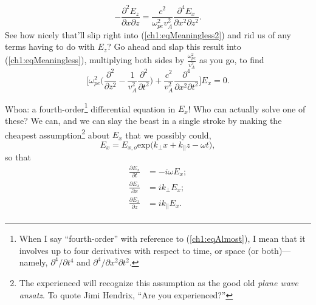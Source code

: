 \begin{equation*}
  -\dfrac{\partial^2 E_z}{\partial x \partial z} = \dfrac{c^2}{\omega_{pe}^2 v_A^2} \dfrac{\partial^4 E_x}{\partial x^2 \partial z^2}.
\end{equation*}
See how nicely that'll slip right into (\ref{ch1:eqMeaningless2}) and rid us of
any terms having to do with $E_z$? Go ahead and slap this result into
(\ref{ch1:eqMeaningless}), multiplying both sides by
$\frac{\omega_{pe}^2}{v_A^2}$ as you go, to find
\begin{equation} \label{ch1:eqAlmost}
  \Big [ \omega_{pe}^2 \Big ( \dfrac{\partial^2}{\partial z^2} - \dfrac{1}{v_A^2} \dfrac{\partial^2}{\partial t^2} \Big ) + \dfrac{c^2}{v_A^2} \dfrac{\partial^4}{\partial x^2 \partial t^2} \Big ] E_x = 0.
\end{equation}

Whoa: a fourth-order\footnote{When I say ``fourth-order'' with reference to
  (\ref{ch1:eqAlmost}), I mean that it involves up to four derivatives with
  respect to time, or space (or both)---namely, $\partial^4/\partial t^4$ and
  $\partial^4 / \partial x^2 \partial t^2$.}  differential equation in $E_x$!
Who can actually solve one of these? We can, and we can slay the beast in a
single stroke by making the cheapest assumption\footnote{The experienced will
  recognize this assumption as the good old \emph{plane wave ansatz}. To quote
  Jimi Hendrix, ``Are you experienced?''}  about $E_x$ that we possibly could,
\begin{equation*}
  E_x = E_{x,o} \mathrm{exp} \Big ( k_\perp x + k_\parallel z - \omega t \Big ),
\end{equation*}
so that 
\begin{equation} \label{ch1:bro}
  \begin{alignedat}{2}
\frac{\partial E_x}{\partial t} &=  -i \omega E_x; \\
\frac{\partial E_x}{\partial x} &=   i k_\perp E_x; \\
\frac{\partial E_x}{\partial z} &=   i k_\parallel E_x. \\
  \end{alignedat}
\end{equation}

